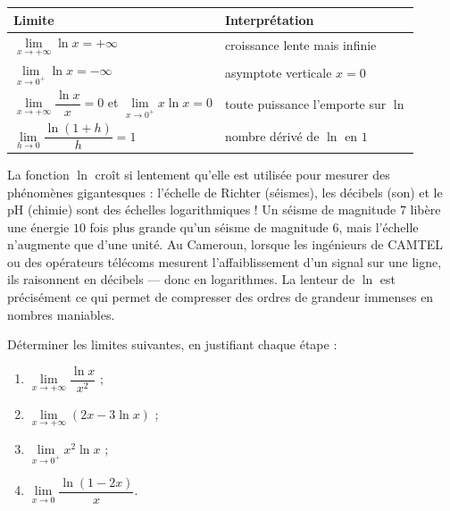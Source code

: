 \documentclass[11pt]{article}
\begin{document}
\begin{aretenir}
\begin{center}
\begin{tabularx}{\linewidth}{|X|X|}
\hline
\rowcolor{popblueL}
\textbf{Limite} & \textbf{Interprétation} \\
\hline
$\lim\limits_{x \to +\infty} \ln x = +\infty$ & croissance lente mais infinie \\
\hline
$\lim\limits_{x \to 0^+} \ln x = -\infty$ & asymptote verticale $x = 0$ \\
\hline
$\lim\limits_{x \to +\infty} \dfrac{\ln x}{x} = 0$ \quad et \quad $\lim\limits_{x \to 0^+} x\ln x = 0$ & toute puissance l'emporte sur $\ln$ \\
\hline
$\lim\limits_{h \to 0} \dfrac{\ln(1+h)}{h} = 1$ & nombre dérivé de $\ln$ en $1$ \\
\hline
\end{tabularx}
\end{center}
\end{aretenir}

\begin{savaistu}
La fonction $\ln$ croît si lentement qu'elle est utilisée pour mesurer des phénomènes gigantesques : l'échelle de Richter (séismes), les décibels (son) et le pH (chimie) sont des échelles logarithmiques ! Un séisme de magnitude $7$ libère une énergie $10$ fois plus grande qu'un séisme de magnitude $6$, mais l'échelle n'augmente que d'une unité. Au Cameroun, lorsque les ingénieurs de CAMTEL ou des opérateurs télécoms mesurent l'affaiblissement d'un signal sur une ligne, ils raisonnent en décibels — donc en logarithmes. La lenteur de $\ln$ est précisément ce qui permet de compresser des ordres de grandeur immenses en nombres maniables.
\end{savaistu}

\begin{exercice}
Déterminer les limites suivantes, en justifiant chaque étape :
\begin{enumerate}
\item $\lim\limits_{x \to +\infty} \dfrac{\ln x}{x^2}$ ;
\item $\lim\limits_{x \to +\infty} (2x - 3\ln x)$ ;
\item $\lim\limits_{x \to 0^+} x^2 \ln x$ ;
\item $\lim\limits_{x \to 0} \dfrac{\ln(1 - 2x)}{x}$.
\end{enumerate}
\end{exercice}
\end{document}
